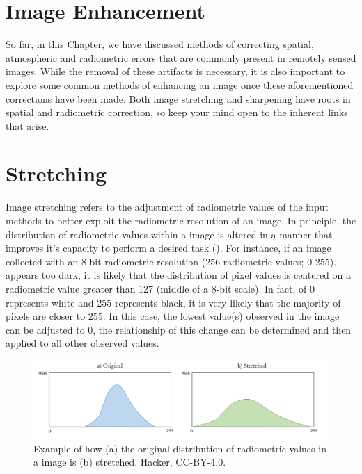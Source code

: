 \documentclass[
]{book}
\begin{document}
\hypertarget{image-enhancement}{%
\section{Image Enhancement}\label{image-enhancement}}

So far, in this Chapter, we have discussed methods of correcting
spatial, atmospheric and radiometric errors that are commonly present in
remotely sensed images. While the removal of these artifacts is
necessary, it is also important to explore some common methods of
enhancing an image once these aforementioned corrections have been made.
Both image stretching and sharpening have roots in spatial and
radiometric correction, so keep your mind open to the inherent links
that arise.

\hypertarget{stretching}{%
\section{Stretching}\label{stretching}}

Image stretching refers to the adjustment of radiometric values of the
input methods to better exploit the radiometric resolution of an image.
In principle, the distribution of radiometric values within a image is
altered in a manner that improves it's capacity to perform a desired
task (). For instance, if an image collected with an 8-bit radiometric
resolution (256 radiometric values; 0-255). appears too dark, it is
likely that the distribution of pixel values is centered on a
radiometric value greater than 127 (middle of a 8-bit scale). In fact,
of 0 represents white and 255 represents black, it is very likely that
the majority of pixels are closer to 255. In this case, the lowest
value(s) observed in the image can be adjusted to 0, the relationship of
this change can be determined and then applied to all other observed
values.

\begin{figure}
\includegraphics[width=1\linewidth]{images/13-stretch} \caption{Example of how (a) the original distribution of radiometric values in a image is (b) stretched. Hacker, CC-BY-4.0.}\label{fig:13-stretch}
\end{figure}
\end{document}
